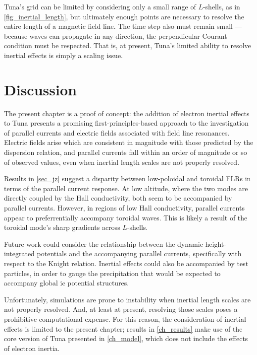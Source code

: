 Tuna's grid can be limited by considering only a small range of $L$-shells, as
in \cref{fig_inertial_length}, but ultimately enough points are necessary to
resolve the entire length of a magnetic field line. The time step also must
remain small --- because waves can propagate in any direction, the
perpendicular Courant condition must be respected. That is, at present, Tuna's
limited ability to resolve inertial effects is simply a scaling issue. 

\section{Discussion}

The present chapter is a proof of concept: the addition of electron inertial
effects to Tuna presents a promising first-principles-based approach to the
investigation of parallel currents and electric fields associated with field
line resonances. Electric fields arise which are consistent in magnitude with
those predicted by the dispersion relation, and parallel currents fall within
an order of magnitude or so of observed values, even when inertial length
scales are not properly resolved. 

Results in \cref{sec_jz} suggest a disparity between low-\azm poloidal and
toroidal FLRs in terms of the parallel current response. At low altitude, where
the two modes are directly coupled by the Hall conductivity, both seem to be
accompanied by parallel currents. However, in regions of low Hall conductivity,
parallel currents appear to preferrentially accompany toroidal waves. This is
likely a result of the toroidal mode's sharp gradients across $L$-shells. 

Future work  could consider the relationship between the dynamic
height-integrated potentials and the accompanying parallel currents,
specifically with respect to the Knight relation\cite{knight_1973}. Inertial
effects could also be accompanied by test particles, in order to gauge the
precipitation that would be expected to accompany global \Alfven{}ic potential
structures. 

Unfortunately, simulations are prone to instability when inertial length scales
are not properly resolved. And, at least at present, resolving those scales
poses a prohibitive computational expense. For this reason, the consideration
of inertial effects is limited to the present chapter; results in
\cref{ch_results} make use of the core version of Tuna presented in
\cref{ch_model}, which does not include the effects of electron inertia. 

